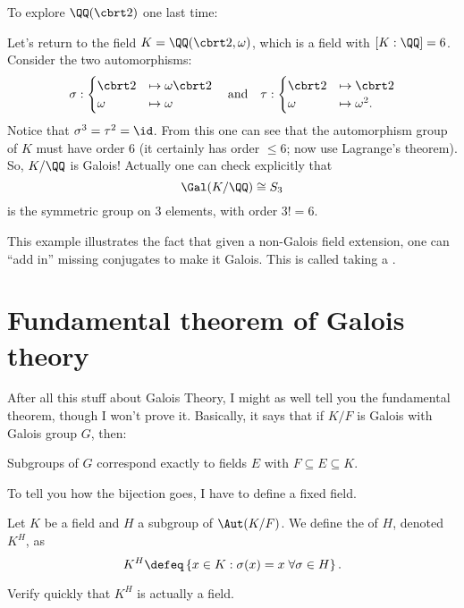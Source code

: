 To explore $\QQ(\cbrt 2)$ one last time:
\begin{example}
	Let's return to the field $K = \QQ(\cbrt 2, \omega)$,
	which is a field with $[K:\QQ] = 6$.
	Consider the two automorphisms:
	\[
		\sigma:
		\begin{cases}
			\cbrt 2 &\mapsto \omega \cbrt 2 \\
			\omega &\mapsto \omega
		\end{cases}
		\quad\text{and}\quad
		\tau:
		\begin{cases}
			\cbrt 2 &\mapsto \cbrt 2 \\
			\omega &\mapsto \omega^2.
		\end{cases}
	\]
	Notice that $\sigma^3 = \tau^2 = \id$.
	From this one can see that the automorphism group of $K$ must have order $6$
	(it certainly has order $\le 6$; now use Lagrange's theorem).
	So, $K/\QQ$ is Galois! Actually one can check explicitly that
	\[ \Gal(K/\QQ) \cong S_3 \]
	is the symmetric group on $3$ elements, with order $3! = 6$.
\end{example}
This example illustrates the fact that
given a non-Galois field extension,
one can ``add in'' missing conjugates to make it Galois.
This is called taking a .

\section{Fundamental theorem of Galois theory}
After all this stuff about Galois Theory, I might as well tell you the fundamental theorem,
though I won't prove it.
Basically, it says that if $K/F$ is Galois with Galois group $G$, then:
\begin{moral}
	Subgroups of $G$ correspond exactly to fields $E$ with $F \subseteq E \subseteq K$.
\end{moral}

To tell you how the bijection goes, I have to define a fixed field.
\begin{definition}
	Let $K$ be a field and $H$ a subgroup of $\Aut(K/F)$.
	We define the  of $H$, denoted $K^H$, as
	\[ K^H \defeq \left\{ x \in K : \sigma(x)=x \; \forall \sigma \in H \right\}. \]
\end{definition}
\begin{ques}
	Verify quickly that $K^H$ is actually a field.
\end{ques}


